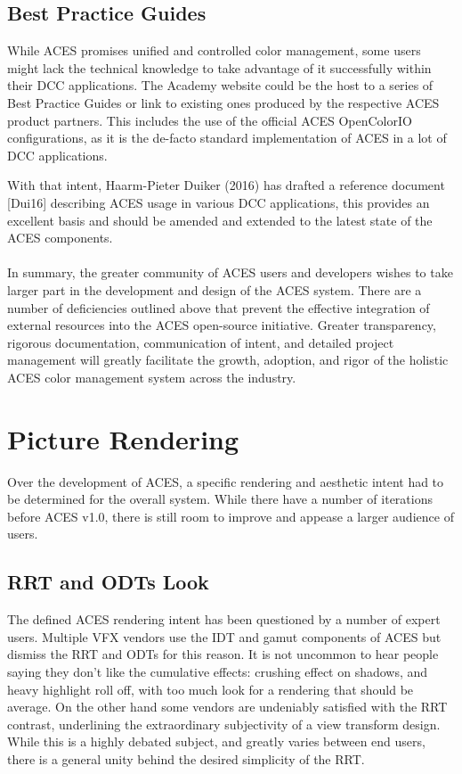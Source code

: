 \documentclass[conference]{IEEEtran}
\begin{document}
\subsection{Best Practice Guides}
While ACES promises unified and controlled color management, some users might lack the technical knowledge to take advantage of it successfully within their DCC applications. The Academy website could be the host to a series of Best Practice Guides or link to existing ones produced by the respective ACES product partners. This includes the use of the official ACES OpenColorIO configurations, as it is the de-facto standard implementation of ACES in a lot of DCC applications.

With that intent, Haarm-Pieter Duiker (2016) has drafted a reference document [Dui16] describing ACES usage in various DCC applications, this provides an excellent basis and should be amended and extended to the latest state of the ACES components.
\\ \\
In summary, the greater community of ACES users and developers wishes to take larger part in the development and design of the ACES system. There are a number of deficiencies outlined above that prevent the effective integration of external resources into the ACES open-source initiative. Greater transparency, rigorous documentation, communication of intent, and detailed project management will greatly facilitate the growth, adoption, and rigor of the holistic ACES color management system across the industry.

\section{Picture Rendering}

Over the development of ACES, a specific rendering and aesthetic intent had to be determined for the overall system. While there have a number of iterations before ACES v1.0, there is still room to improve and appease a larger audience of users.

\subsection{RRT and ODTs Look}
The defined ACES rendering intent has been questioned by a number of expert users. Multiple VFX vendors use the IDT and gamut components of ACES but dismiss the RRT and ODTs for this reason. It is not uncommon to hear people saying they don't like the cumulative effects: crushing effect on shadows, and heavy highlight roll off, with too much look for a rendering that should be average. On the other hand some vendors are undeniably satisfied with the RRT contrast, underlining the extraordinary subjectivity of a view transform design. While this is a highly debated subject, and greatly varies between end users, there is a general unity behind the desired simplicity of the RRT.
\end{document}
